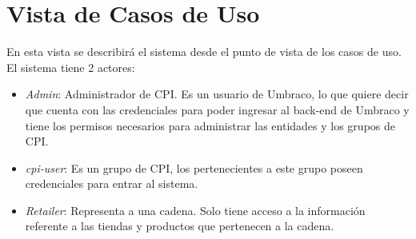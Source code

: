 \vskip 2cm
    \section{Vista de Casos de Uso} \label{vistaCasosDeUso}
    En esta vista se describirá el sistema desde el punto de vista de los casos de uso. El sistema tiene 2 actores:

    \begin{itemize}
        \item \emph{Admin}: Administrador de CPI. Es un usuario de Umbraco, lo que quiere decir que cuenta con las credenciales para poder ingresar al back-end de Umbraco y tiene los permisos necesarios para administrar las entidades y los grupos de CPI.
        \item \emph{cpi-user}: Es un grupo de CPI, los pertenecientes a este grupo poseen credenciales para entrar al sistema.
        \item \emph{Retailer}: Representa a una cadena. Solo tiene acceso a la información referente a las tiendas y productos que pertenecen a la cadena.
         \end{itemize}
\pagebreak
